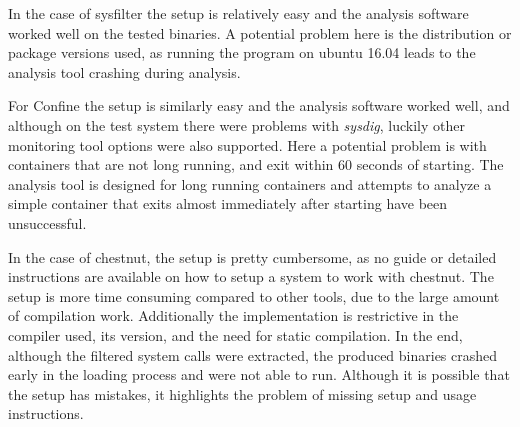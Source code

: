 In the case of sysfilter the setup is relatively easy and the analysis software worked well on the tested binaries. A potential problem here is the distribution or package versions used, as running the program on ubuntu 16.04 leads to the analysis tool crashing during analysis.

For Confine the setup is similarly easy and the analysis software worked well, and although on the test system there were problems with \textit{sysdig}, luckily other monitoring tool options were also supported.
Here a potential problem is with containers that are not long running, and exit within 60 seconds of starting. The analysis tool is designed for long running containers and attempts to analyze a simple container that exits almost immediately after starting have been unsuccessful.

In the case of chestnut, the setup is pretty cumbersome, as no guide or detailed instructions are available on how to setup a system to work with chestnut.
The setup is more time consuming compared to other tools, due to the large amount of compilation work.
Additionally the implementation is restrictive in the compiler used, its version, and the need for static compilation.
In the end, although the filtered system calls were extracted, the produced binaries crashed early in the loading process and were not able to run.
Although it is possible that the setup has mistakes, it highlights the problem of missing setup and usage instructions.

